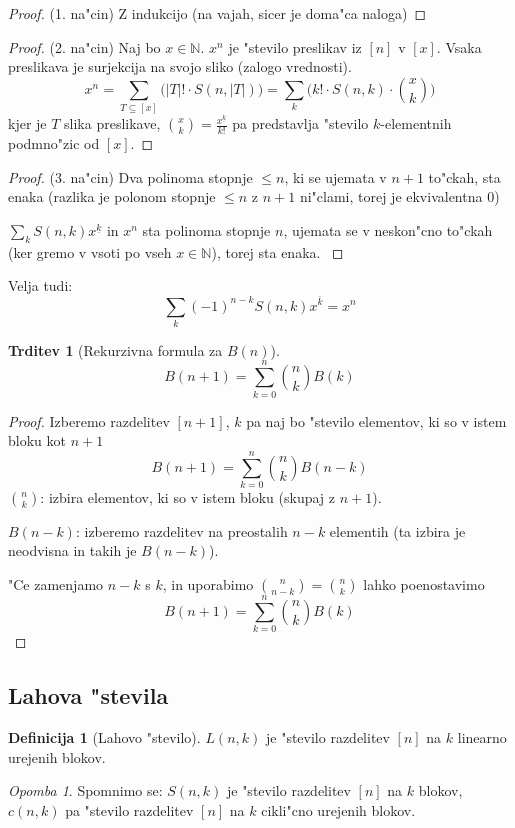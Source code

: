 \documentclass[a4paper,12pt]{article}
\theoremstyle{definition}
\newtheorem{defn}[counter]{Definicija}
\newtheorem{claim}[counter]{Trditev}
\theoremstyle{remark}
\newtheorem*{rem}{Opomba}
\newcommand{\N}{\mathbb{N}}
\begin{document}
\begin{proof}(1. na"cin)
	Z indukcijo (na vajah, sicer je doma"ca naloga)
\end{proof}
\begin{proof}(2. na"cin)
    Naj bo $x \in \N$.
    $x^n$ je "stevilo preslikav iz $[n]$ v $[x]$.
    Vsaka preslikava je surjekcija na svojo sliko (zalogo vrednosti).
    \[x^n = \sum_{T \subseteq [x]} \big(|T|! \cdot S(n,|T|)\big) = \sum_k \big(k! \cdot S(n,k) \cdot \binom{x}{k}\big)\]
    kjer je $T$ slika preslikave, $\binom{x}{k} = \frac{x^{\underline{k}}}{k!}$ pa predstavlja "stevilo $k$-elementnih podmno"zic od $[x]$.
\end{proof}

\begin{proof}(3. na"cin)
	Dva polinoma stopnje $\leqslant n$, ki se ujemata v $n+1$ to"ckah, sta enaka (razlika je polonom stopnje $\leqslant n$ z $n+1$ ni"clami, torej je ekvivalentna 0)

	$\sum_k S(n,k)x^{\underline{k}}$ in $x^n$ sta polinoma stopnje $n$, ujemata se v neskon"cno to"ckah (ker gremo v vsoti po vseh $x \in \N$), torej sta enaka.
	\label{TODO: zakaj se ujemata?}
\end{proof}

Velja tudi: \[\sum_k (-1)^{n-k} S(n,k) x^{\overline{k}} = x^n\]

\begin{claim}[Rekurzivna formula za $B(n)$]
    \[B(n+1) = \sum_{k=0}^n \binom{n}{k} B(k)\]
\end{claim}

\begin{proof}
    Izberemo razdelitev $[n+1]$, $k$ pa naj bo "stevilo elementov, ki so v istem bloku kot $n+1$
    \[B(n+1) = \sum_{k=0}^n \binom{n}{k}B(n-k)\]
    $\binom{n}{k}$: izbira elementov, ki so v istem bloku (skupaj z $n+1$).
    
    $B(n-k)$: izberemo razdelitev na preostalih $n-k$ elementih (ta izbira je neodvisna in takih je $B(n-k)$).
    
    "Ce zamenjamo $n-k$ s $k$, in uporabimo $\binom{n}{n-k} = \binom{n}{k}$ lahko poenostavimo
    \[B(n+1) = \sum_{k=0}^n \binom{n}{k}B(k)\]
\end{proof}

\subsection{Lahova "stevila}
\begin{defn}[Lahovo "stevilo]
	$L(n,k)$ je "stevilo razdelitev $[n]$ na $k$ linearno urejenih blokov.
\end{defn}
\begin{rem}
	Spomnimo se: $S(n,k)$ je "stevilo razdelitev $[n]$ na $k$ blokov, $c(n,k)$ pa "stevilo razdelitev $[n]$ na $k$ cikli"cno urejenih blokov.
\end{rem}
\end{document}
